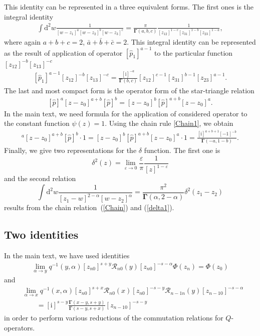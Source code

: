 \documentclass[pdftex]{sigma}
\renewcommand{\imath}{\mathrm{i}}
\numberwithin{equation}{section}
\begin{document}
This identity can be represented in a three equivalent forms.
The first ones is the integral identity
\begin{align}\label{Star}
\int \mathrm{d}^2 w \frac{1}{[w-z_1]^a[w-z_2]^b [w-z_3]^c}
 = \frac{\pi}{\mathbf{\Gamma}(a,b,c)}
\frac{1}{[z_{12}]^{1-c}[z_{31}]^{1-b}[z_{23}]^{1-a}} ,
\end{align}
where again $a+b+c=2$, $\bar a+\bar b+\bar c=2$.
This integral identity can be represented as the result of application
of operator $[\hat{p}_1]^{a-1}$ to the particular function
$[z_{12}]^{-b} [z_{13}]^{-c}$
\begin{align}\label{Star1}
[\hat{p}_1]^{a-1} [z_{12}]^{-b} [z_{13}]^{-c}
= \frac{[\imath]^{-a}}
{\mathbf{\Gamma}(b,c)}
[z_{12}]^{c-1} [z_{31}]^{b-1} [z_{23}]^{a-1}.
\end{align}
The last and most compact form is the operator form of the star-triangle relation \cite{DM1,DM2, Isa}
\begin{align}\label{star-tr}
[\hat{p}]^{a} [z-z_0]^{a+b} [\hat{p}]^{b} =
[z-z_0]^{b} [\hat{p}]^{a+b} [z-z_0]^{a}.
\end{align}
In the main text, we need formula for the application of considered operator to the constant function $\psi(z) = 1$. Using the chain rule
\eqref{Chain1}, we obtain
\begin{align*}
[\hat{p}]^{a} [z -z_0]^{a+b} [\hat{p}]^{b}\cdot 1 =
[z-z_0]^{b} [\hat{p}]^{a+b} [z-z_0]^{a}\cdot 1 =
\frac{[\imath]^{a+b+1} [-1]^{-b}}{\mathbf{\Gamma}(-a,1-b)}.
\end{align*}
Finally, we give two representations for the $\delta$ function.
The first one is
\begin{equation}\label{delta1}
	\delta^2(z)=\lim_{\varepsilon\to 0}\frac{\varepsilon}{\pi} \frac{1}{[z]^{1-\varepsilon}}
\end{equation}
and the second relation
\begin{equation*}
	\int \mathrm{d}^2 w \frac{1}{[z_1-w]^{2-\alpha}[w-z_2]^\alpha} =
	\frac{\pi^2}{\mathbf{\Gamma}(\alpha,2-\alpha)} \delta^2(z_1-z_2)
\end{equation*}
results from the chain relation~(\ref{Chain}) and (\ref{delta1}).

\subsection{Two identities}

In the main text, we have used identities
\begin{align}\label{del}
\lim\limits_{\alpha\to y}
q^{-1}(y,\alpha)
[z_{n0}]^{s+y} \mathcal{R}_{n 0}(y) [z_{n0}]^{-s-\alpha} \Phi(z_n) =
\Phi(z_0)
\end{align}
and
\begin{align}
& \nonumber
\lim\limits_{\alpha\to x}
q^{-1}(x,\alpha)
[z_{n0}]^{s+x} \mathcal{R}_{n 0}(x) [z_{n0}]^{-s-y}
\mathcal{R}_{n-1 n}(y) [z_{n-1 0}]^{-s-\alpha} \\
&\label{del1}
\qquad =
[\imath]^{s-y} \frac{\mathbf{\Gamma}(x-y,s+y)}
{\mathbf{\Gamma}(s-y,s+x)} [z_{n-1 0}]^{-s-y}
\end{align}
in order to perform various reductions of the commutation
relations for $Q$-operators.
\end{document}

